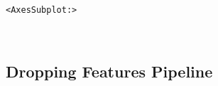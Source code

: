 \documentclass[11pt]{article}
\makeatletter
\newcommand{\boxspacing}{\kern\kvtcb@left@rule\kern\kvtcb@boxsep}
\newcommand{\prompt}[4]{
        {\ttfamily\llap{{\color{#2}[#3]:\hspace{3pt}#4}}\vspace{-\baselineskip}}
    }
\makeatother
\begin{document}
            \begin{tcolorbox}[breakable, size=fbox, boxrule=.5pt, pad at break*=1mm, opacityfill=0]
\prompt{Out}{outcolor}{20}{\boxspacing}
\begin{Verbatim}[commandchars=\\\{\}]
<AxesSubplot:>
\end{Verbatim}
\end{tcolorbox}
        
    \begin{center}
    \end{center}
    { \hspace*{\fill} \\}
    
    \hypertarget{dropping-features-pipeline}{%
\subsection{Dropping Features
Pipeline}\label{dropping-features-pipeline}}
\end{document}
